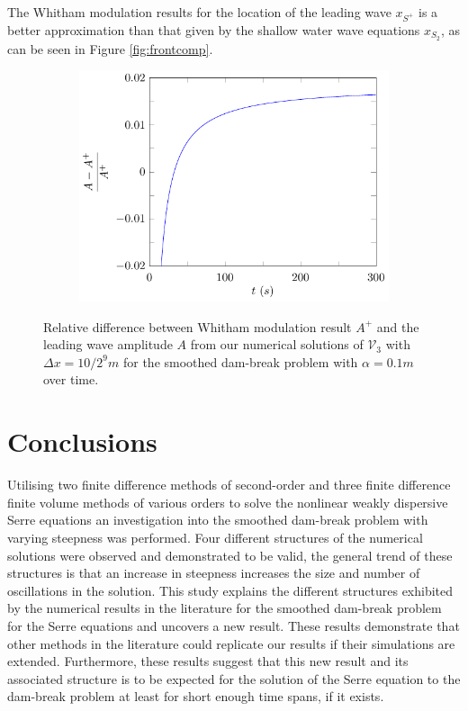 \documentclass[times]{elsarticle}
\begin{document}
The Whitham modulation results for the location of the leading wave $x_{S^+}$ is a better approximation than that given by the shallow water wave equations $x_{S_2}$, as can be seen in Figure \ref{fig:frontcomp}.
\begin{figure}
	\centering
	\begin{subfigure}{0.5\textwidth}\centering
		\includegraphics[width=\textwidth]{Figure-36.pdf}
	\end{subfigure}%
	\caption{Relative difference between Whitham modulation result $A^+$ and the leading wave amplitude $A$ from our numerical solutions of $\mathcal{V}_3$ with $\Delta x = 10/2^{9}m$ for the smoothed dam-break problem with $\alpha = 0.1m$ over time.}
	\label{fig:amplitudefront}
\end{figure}
\section{Conclusions}
\label{section:Conclusions}
Utilising two finite difference methods of second-order and three finite difference finite volume methods of various orders to solve the nonlinear weakly dispersive Serre equations an investigation into the smoothed dam-break problem with varying steepness was performed. Four different structures of the numerical solutions were observed and demonstrated to be valid, the general trend of these structures is that an increase in steepness increases the size and number of oscillations in the solution. This study explains the different structures exhibited by the numerical results in the literature for the smoothed dam-break problem for the Serre equations and uncovers a new result. These results demonstrate that other methods in the literature could replicate our results if their simulations are extended. Furthermore, these results suggest that this new result and its associated structure is to be expected for the solution of the Serre equation to the dam-break problem at least for short enough time spans, if it exists.
\end{document}
